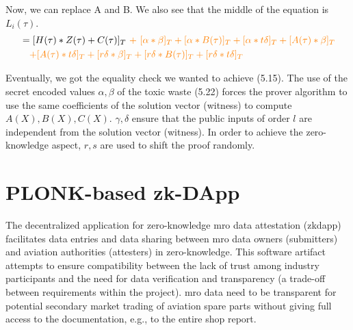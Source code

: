 Now, we can replace A and B. We also see that the middle of the equation is \(L_i(\tau)\).
 \begin{equation*}
     \begin{split}
     &=[H(\tau) * Z(\tau) + C(\tau)]_T \textcolor{orange}{\ +\  [\alpha * \beta]_T + [\alpha * B(\tau)]_T + [\alpha * t\delta]_T + [A(\tau) * \beta]_T} \\
     &\ \ \ \textcolor{orange}{+ [A(\tau) * t\delta]_T + [r\delta * \beta]_T + [r\delta * B(\tau)]_T + [r\delta * t\delta]_T}
     \end{split}
 \end{equation*}

Eventually, we got the equality check we wanted to achieve (5.15). The use of the secret encoded values \(\alpha, \beta\) of the toxic waste (5.22) forces the prover algorithm to use the same coefficients of the solution vector (witness) to compute \(A(X), B(X), C(X)\). \(\gamma, \delta\) ensure that the public inputs of order \(l\) are independent from the solution vector (witness). In order to achieve the zero-knowledge aspect, \(r, s\) are used to shift the proof randomly.

\section{PLONK-based zk-DApp}
The decentralized application for zero-knowledge \acrshort{mro} data attestation (\acrshort{zkdapp}) facilitates data entries and data sharing between \acrshort{mro} data owners (submitters) and aviation authorities (attesters) in zero-knowledge. This software artifact attempts to ensure compatibility between the lack of trust among industry participants and the need for data verification and transparency (a trade-off between requirements within the project). \acrshort{mro} data need to be transparent for potential secondary market trading of aviation spare parts without giving full access to the documentation, e.g., to the entire shop report.

